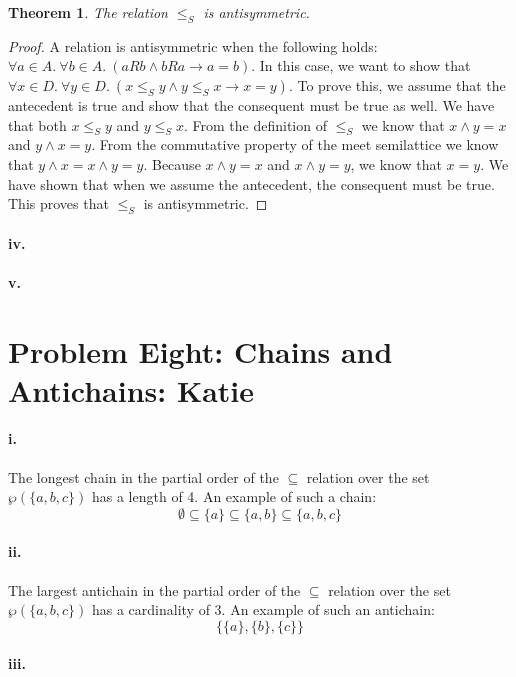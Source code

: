 \documentclass[10pt,letter]{article}
\newtheorem*{thm}{Theorem}
\begin{document}
\begin{thm} The relation $\le_S$ is antisymmetric. \end{thm}
\begin{proof} A relation is antisymmetric when the following holds: $\forall a \in A .\ \forall b \in A .\ (aRb \wedge bRa \rightarrow a = b)$. In this case, we want to show that $\forall x \in D .\ \forall y \in D .\ (x \le_S y \wedge y \le_S x \rightarrow x = y)$. To prove this, we assume that the antecedent is true and show that the consequent must be true as well. We have that both $x \le_S y$ and $y \le_S x$. From the definition of $\le_S$ we know that $x \wedge y = x$ and $y \wedge x = y$. From the commutative property of the meet semilattice we know that $y \wedge x = x \wedge y = y$. Because $x \wedge y = x$ and $x \wedge y = y$, we know that $x = y$. We have shown that when we assume the antecedent, the consequent must be true. This proves that $\le_S$ is antisymmetric.
\end{proof}

\paragraph{iv.}
\paragraph{v.}

\section*{Problem Eight: Chains and Antichains: Katie}

\paragraph{i.} The longest chain in the partial order of the $\subseteq$ relation over the set $\wp(\{a, b, c\})$ has a length of 4. An example of such a chain:
$$\emptyset \subseteq \{a\} \subseteq \{a, b\} \subseteq \{a, b, c\}$$

\paragraph{ii.} The largest antichain in the partial order of the $\subseteq$ relation over the set $\wp(\{a, b, c\})$ has a cardinality of 3. An example of such an antichain:
$$\{\{a\}, \{b\}, \{c\}\}$$

\paragraph{iii.}
\end{document}
